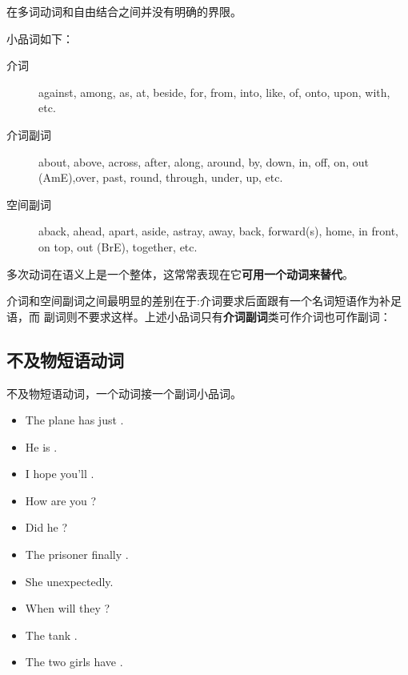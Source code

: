 在多词动词和自由结合之间并没有明确的界限。

小品词如下：
\begin{description}
\item[介词] against, among, as, at, beside, for, from, into, like, of, onto,
upon, with, etc.

\item[介词副词] about, above, across, after, along, around, by, down, in, off,
on, out (AmE),over, past, round, through, under, up, etc.

\item[空间副词] aback, ahead, apart, aside, astray, away, back, forward(s),
home, in front, on top, out (BrE), together, etc.

\end{description}

多次动词在语义上是一个整体，这常常表现在它\textbf{可用一个动词来替代}。

介词和空间副词之间最明显的差别在于:介词要求后面跟有一个名词短语作为补足语，而
副词则不要求这样。上述小品词只有\textbf{介词副词}类可作介词也可作副词：


\subsection{不及物短语动词}

不及物短语动词，一个动词接一个副词小品词。
\begin{itemize}
\item The plane has just .
\item He is .
\item I hope you'll .
\item How are you ?
\item Did he ?
\item The prisoner finally .
\item She  unexpectedly.
\item When will they ?
\item The tank .
\item The two girls have .

\end{itemize}

